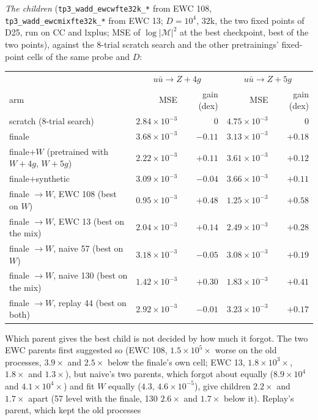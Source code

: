 \documentclass[11pt]{article}
\newcommand{\code}[1]{\texttt{#1}}
\begin{document}
\emph{The children} (\code{tp3\_wadd\_ewcwfte32k\_*} from EWC 108, \code{tp3\_wadd\_ewcmixfte32k\_*} from EWC 13; $D=10^4$,
$32$k, the two fixed points of D25, run on CC and lxplus; MSE of $\log|\mathcal M|^2$ at the best checkpoint, best of the
two points), against the $8$-trial scratch search and the other pretrainings' fixed-point cells of the same probe and $D$:
\begin{center}\small
\begin{tabular}{lrrrr}
\toprule
 & \multicolumn{2}{c}{$u\bar u\to Z+4g$} & \multicolumn{2}{c}{$u\bar u\to Z+5g$} \\
arm & MSE & gain (dex) & MSE & gain (dex) \\
\midrule
scratch ($8$-trial search) & $2.84\times10^{-3}$ & $0$ & $4.75\times10^{-3}$ & $0$ \\
finale & $3.68\times10^{-3}$ & $-0.11$ & $3.13\times10^{-3}$ & $+0.18$ \\
finale$+W$ (pretrained with $W+4g$, $W+5g$) & $2.22\times10^{-3}$ & $+0.11$ & $3.61\times10^{-3}$ & $+0.12$ \\
finale$+$synthetic & $3.09\times10^{-3}$ & $-0.04$ & $3.66\times10^{-3}$ & $+0.11$ \\
finale $\to W$, EWC 108 (best on $W$) & $0.95\times10^{-3}$ & $+0.48$ & $1.25\times10^{-3}$ & $+0.58$ \\
finale $\to W$, EWC 13 (best on the mix) & $2.04\times10^{-3}$ & $+0.14$ & $2.49\times10^{-3}$ & $+0.28$ \\
finale $\to W$, naive 57 (best on $W$) & $3.18\times10^{-3}$ & $-0.05$ & $3.08\times10^{-3}$ & $+0.19$ \\
finale $\to W$, naive 130 (best on the mix) & $1.42\times10^{-3}$ & $+0.30$ & $1.83\times10^{-3}$ & $+0.41$ \\
finale $\to W$, replay 44 (best on both) & $2.92\times10^{-3}$ & $-0.01$ & $3.23\times10^{-3}$ & $+0.17$ \\
\bottomrule
\end{tabular}
\end{center}
Which parent gives the best child is not decided by how much it forgot. The two EWC parents first suggested so
(EWC 108, $1.5\times10^{5}\times$ worse on the old processes, $3.9\times$ and $2.5\times$ below the finale's own cell; EWC 13,
$1.8\times10^{3}\times$, $1.8\times$ and $1.3\times$), but naive's two parents, which forgot about equally ($8.9\times10^{4}$
and $4.1\times10^{4}\times$) and fit $W$ equally ($4.3$, $4.6\times10^{-5}$), give children $2.2\times$ and $1.7\times$
apart (57 level with the finale, 130 $2.6\times$ and $1.7\times$ below it). Replay's parent, which kept the old processes
\end{document}
